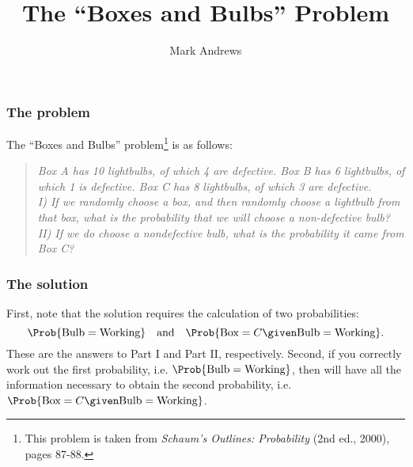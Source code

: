 \documentclass{slides}
\title{The ``Boxes and Bulbs'' Problem}
\author[Andrews]{Mark Andrews}
\begin{document}
{
	\begin{frame}
		\titlepage
	\end{frame}
}


\begin{frame}
\frametitle{The problem}

The ``Boxes and Bulbs'' problem\footnote{This problem is taken from \emph{Schaum's Outlines: Probability} (2nd ed., 2000), pages 87-88.} is as follows:
\begin{quotation}
{\itshape
Box A has 10 lightbulbs, of which 4 are defective.
Box B has 6 lightbulbs, of which 1 is defective.
Box C has 8 lightbulbs, of which 3 are defective.
\\
I) If we randomly choose a box, and then randomly choose a lightbulb from that box, what is the probability that we will choose a non-defective bulb?
II) If we do choose a nondefective bulb, what is the probability it came from Box C? 
}
\end{quotation}
\end{frame}
%
\begin{frame}
\frametitle{The solution}

First, note that the solution requires the calculation of two probabilities:
\[
\Prob{\text{Bulb}=\text{Working}} \quad\text{and}\quad \Prob{\text{Box}=C\given\text{Bulb}=\text{Working}}.
\]
These are the answers to Part I and Part II, respectively. Second, if you
correctly work out the first probability, i.e.
$\Prob{\text{Bulb}=\text{Working}}$, then will have all the information
necessary to obtain the second probability, i.e.
$\Prob{\text{Box}=C\given\text{Bulb}=\text{Working}}$. 
\end{frame}
\end{document}

